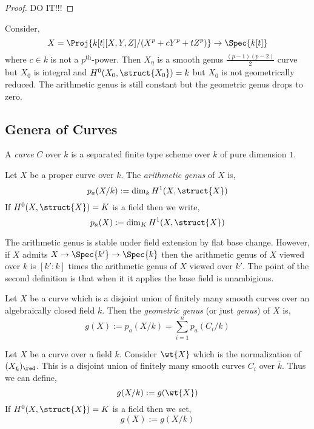 \documentclass[12pt]{article}
\begin{document}
\begin{proof}
DO IT!!!
\end{proof}

\begin{example} \label{example:geometrically_nonreduced}
Consider,
\[ X = \Proj{k[t][X,Y,Z]/(X^p + c Y^p + t Z^p)} \to \Spec{k[t]} \]
where $c \in k$ is not a $p^{\text{th}}$-power. Then $X_\eta$ is a smooth genus $\frac{(p-1)(p-2)}{2}$ curve but $X_0$ is integral and $H^0(X_0, \struct{X_0}) = k$ but $X_0$ is not geometrically reduced. The arithmetic genus is still constant but the geometric genus drops to zero. 
\end{example}

\subsection{Genera of Curves}

\begin{defn}
A \textit{curve} $C$ over $k$ is a separated finite type scheme over $k$ of pure dimension $1$.
\end{defn}

\begin{defn}
Let $X$ be a proper curve over $k$. The \textit{arithmetic genus} of $X$ is,
\[ p_a(X/k) := \dim_k H^1(X, \struct{X}) \]
If $H^0(X, \struct{X}) = K$ is a field then we write,
\[ p_a(X) := \dim_K H^1(X, \struct{X}) \]
\end{defn}

\begin{rmk}
The arithmetic genus is stable under field extension by flat base change. However, if $X$ admits $X \to \Spec{k'} \to \Spec{k}$ then the arithmetic genus of $X$ viewed over $k$ is $[k' : k]$ times the arithmetic genus of $X$ viewed over $k'$. The point of the second definition is that when it it applies the base field is unambigious.
\end{rmk}

\begin{defn}
Let $X$ be a curve which is a disjoint union of finitely many smooth curves over an algebraically closed field $k$. Then the \textit{geometric genus} (or just \textit{genus}) of $X$ is,
\[ g(X) := p_a(X/k) = \sum_{i = 1}^n p_a(C_i / k) \]
\end{defn}

\begin{defn}
Let $X$ be a curve over a field $k$. Consider $\wt{X}$ which is the normalization of $(X_{\bar{k}})_{\red}$. This is a disjoint union of finitely many smooth curves $C_i$ over $\bar{k}$. Thus we can define,
\[ g(X/k) := g(\wt{X}) \]
If $H^0(X, \struct{X}) = K$ is a field then we set,
\[ g(X) := g(X/k) \]
\end{defn}
\end{document}
